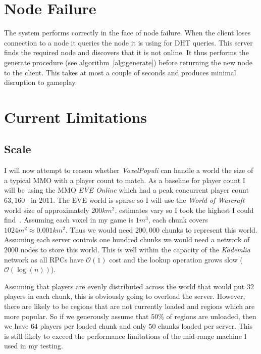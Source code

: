 \documentclass[12pt,notitlepage,a4paper]{report}
\newcommand{\kademlia}{\emph{Kademlia}}
\newcommand{\voxpop}{\emph{VoxelPopuli}}
\begin{document}
	\section{Node Failure}
	The system performs correctly in the face of node failure. When the client loses connection to a node it queries the node it is using for DHT queries. This server finds the required node and discovers that it is not online. It thus performs the generate procedure (see algorithm~\ref{alg:generate}) before returning the new node to the client. This takes at most a couple of seconds and produces minimal disruption to gameplay.
	
	\section{Current Limitations}
	\label{sec:limits}
	\subsection{Scale}
	I will now attempt to reason whether \voxpop{} can handle a world the size of a typical MMO with a player count to match. As a baseline for player count I will be using the MMO \emph{EVE Online} which had a peak concurrent player count $63,160$~\cite{eve} in 2011. The EVE world is sparse so I will use the \emph{World of Warcraft} world size of approximately $200km^2$, estimates vary so I took the highest I could find~\cite{wowsize}. Assuming each voxel in my game is $1m^3$, each chunk covers $1024m^2 \approx 0.001km^2$. Thus we would need $200,000$ chunks to represent this world. Assuming each server controls one hundred chunks we would need a network of $2000$ nodes to store this world. This is well within the capacity of the \kademlia{} network as all RPCs have $\mathcal{O}(1)$ cost and the lookup operation grows slow ($\mathcal{O}(\log(n))$).
	
	Assuming that players are evenly distributed across the world that would put $32$ players in each chunk, this is obviously going to overload the server. However, there are likely to be regions that are not currently loaded and regions which are more popular. So if we generously assume that $50\%$ of regions are unloaded, then we have $64$ players per loaded chunk and only $50$ chunks loaded per server. This is still likely to exceed the performance limitations of the mid-range machine I used in my testing.
	
\end{document}
